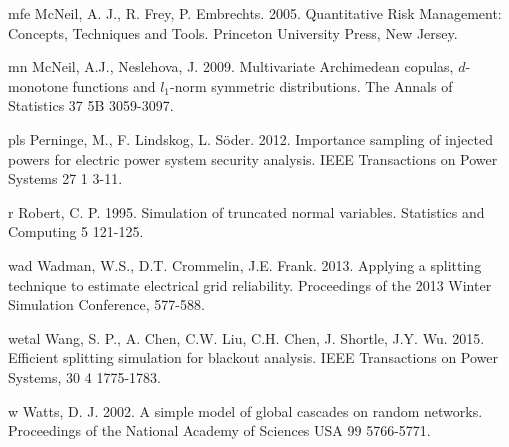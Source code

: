 \documentclass[final,11pt,3p]{article}\usepackage{setspace}
\begin{document}
\begin{thebibliography}{}
\bibitem 
{mfe}
McNeil, A. J., R. Frey, P. Embrechts. 2005. Quantitative Risk Management: Concepts, Techniques and Tools. Princeton University Press, New Jersey.

\bibitem 
{mn}
McNeil, A.J., Neslehova, J. 2009. Multivariate Archimedean copulas, $d$-monotone functions and $l_1$-norm symmetric distributions. The Annals of Statistics 37 5B 3059-3097.

\bibitem 
{pls}
Perninge, M., F. Lindskog, L. S\"{o}der. 2012. Importance sampling of injected powers for electric power system security analysis. IEEE Transactions on Power Systems 27 1 3-11. 

\bibitem 
{r}
Robert, C. P. 1995. Simulation of truncated normal variables. Statistics and Computing 5 121-125.

\bibitem
{wad}
Wadman, W.S., D.T. Crommelin, J.E. Frank. 2013. Applying a splitting technique to estimate electrical grid reliability. Proceedings of the 2013 Winter Simulation Conference, 577-588.

\bibitem
{wetal}
Wang, S. P., A. Chen, C.W. Liu, C.H. Chen, J. Shortle, J.Y. Wu. 2015. Efficient splitting simulation for blackout analysis. IEEE Transactions on Power Systems, 30 4 1775-1783.

\bibitem 
{w}
Watts, D. J. 2002. A simple model of global cascades on random networks. Proceedings of the National Academy of Sciences USA 99 5766-5771.

\end{thebibliography}
\end{document}
